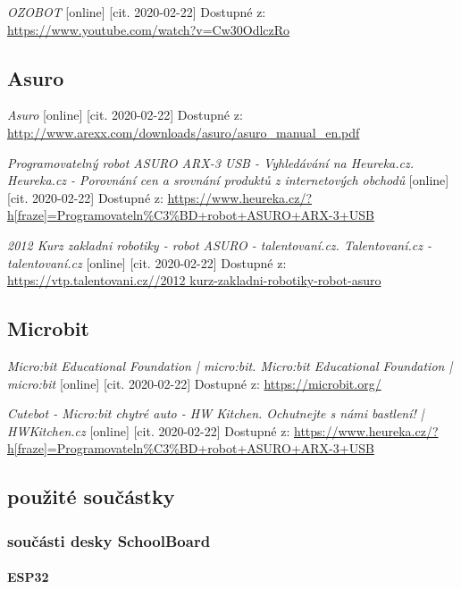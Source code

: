\documentclass{template/socthesis}
\begin{document}
\begin{thebibliography}{1}
	\textit{OZOBOT} [online] [cit. 2020-02-22] Dostupné z:
	\url{https://www.youtube.com/watch?v=Cw30OdlczRo}
	
	\subsection*{Asuro}
	
	\textit{Asuro} [online] [cit. 2020-02-22] Dostupné z:
	\url{ http://www.arexx.com/downloads/asuro/asuro_manual_en.pdf}
	
	\textit{Programovatelný robot ASURO ARX-3 USB - Vyhledávání na Heureka.cz. Heureka.cz - Porovnání cen a srovnání produktů z internetových obchodů } [online] [cit. 2020-02-22] Dostupné z:
	\url{https://www.heureka.cz/?h[fraze]=Programovateln%C3%BD+robot+ASURO+ARX-3+USB}
		
	\textit{2012 Kurz zakladni robotiky - robot ASURO - talentovaní.cz. Talentovaní.cz - talentovaní.cz} [online] [cit. 2020-02-22] Dostupné z:
	\url{https://vtp.talentovani.cz//2012 kurz-zakladni-robotiky-robot-asuro}
	
	\subsection*{Microbit}
	
	\textit{Micro:bit Educational Foundation | micro:bit. Micro:bit Educational Foundation | micro:bit} [online] [cit. 2020-02-22] Dostupné z:
	\url{https://microbit.org/}
	
	\textit{Cutebot - Micro:bit chytré auto - HW Kitchen. Ochutnejte s námi bastlení! | HWKitchen.cz} [online] [cit. 2020-02-22] Dostupné z:
	\url{https://www.heureka.cz/?h[fraze]=Programovateln%C3%BD+robot+ASURO+ARX-3+USB}
	
	\subsection*{použité součástky}
	
	\subsubsection*{součásti desky SchoolBoard}
	
	\paragraph*{ESP32}
	

\end{thebibliography}
\end{document}
